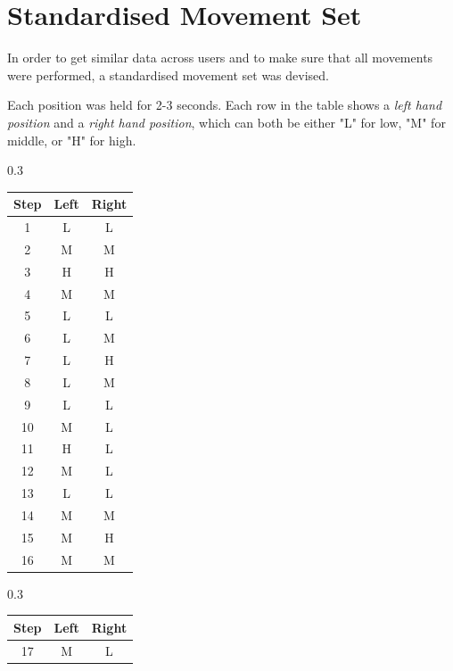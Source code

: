 \chapter{Standardised Movement Set}
\label{appendix: standardised movement set}

In order to get similar data across users and to make sure that all movements were performed, a standardised movement set was devised.

Each position was held for 2-3 seconds. 
Each row in the table shows a \textit{left hand position} and a \textit{right hand position}, which can both be either "L" for low, "M" for middle, or "H" for high.


\begin{table}[h]
    \centering
    \begin{subtable}[t]{0.3\textwidth}
    \centering
    \begin{tabular}[t]{||c|c|c||}
    \hline
    Step & Left & Right\\
    \hline \hline
      1 & L  & L\\
      \hline
      2 & M  &M\\
      \hline
      3 & H & H\\ 
      \hline
      4 & M & M\\ 
      \hline
      5 & L & L\\ 
      \hline
      6 & L & M\\ 
      \hline
      7 & L & H\\ 
      \hline
      8 & L & M\\ 
      \hline
      9 & L & L\\ 
      \hline
      10 & M & L\\
      \hline
      11 & H & L \\
      \hline
      12 & M & L \\
      \hline
      13 & L & L \\
      \hline
      14 & M & M \\
      \hline
      15 & M & H \\
      \hline
      16 & M & M \\
      \hline
    \end{tabular}
    \end{subtable}
    \begin{subtable}[t]{0.3\textwidth}
    \centering
    \begin{tabular}[t]{||c|c|c||}
    \hline
    Step & Left & Right\\
    \hline \hline
      17 & M & L \\

\end{tabular}
\end{subtable}
\end{table}
